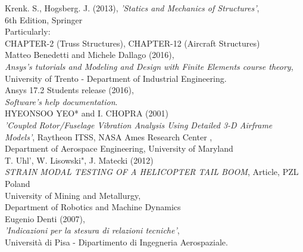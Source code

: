 

\begin{thebibliography}{9}
	Krenk. S., Hogsberg. J. (2013),
	\emph{'Statics and Mechanics of Structures'}, \\ 6th Edition, Springer \\ Particularly: \\ CHAPTER-2 (Truss Structures),  CHAPTER-12 (Aircraft Structures) \\
	
	Matteo Benedetti and Michele Dallago (2016), \\
	\emph{Ansys's tutorials and Modeling and Design with Finite Elements course theory},\\
	University of Trento - Department of Industrial Engineering. \\
	
	
	Ansys 17.2 Students release (2016), \\
	\emph{Software's help documentation}.\\
	
		
	HYEONSOO YEO* and I. CHOPRA (2001) \\
	\emph{'Coupled Rotor/Fuselage Vibration Analysis Using Detailed 3-D Airframe Models'}, Raytheon ITSS, NASA Ames Research Center , \\ Department of Aerospace Engineering, University of Maryland \\
	
	
	T. Uhl', W. Lisowski", J. Matecki (2012) \\
	\emph{STRAIN MODAL TESTING OF A HELICOPTER TAIL BOOM}, Article, PZL Poland \\
	University of Mining and Metallurgy, \\
	Department of Robotics and Machine Dynamics \\
	
	
	Eugenio Denti (2007), \\
	\emph{'Indicazioni per la stesura di relazioni tecniche'},\\
	Università di Pisa - Dipartimento di Ingegneria Aerospaziale. \\
	
	
\end{thebibliography}